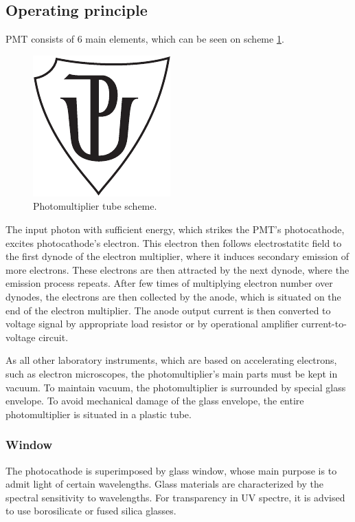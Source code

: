 \subsection{Operating principle}
PMT consists of 6 main elements, which can be seen on scheme \ref{PMT scheme}.

\begin{figure}[H]
 \includegraphics{up_logo_bw}
 \caption{Photomultiplier tube scheme.}
 \label{PMT scheme}
\end{figure}


\par
The input photon with sufficient energy, which strikes the PMT's photocathode, excites photocathode's electron. This electron then follows electrostatitc field to the first dynode of the electron multiplier, where it induces secondary emission of more electrons. These electrons are then attracted by the next dynode, where the emission process repeats. After few times of multiplying electron number over dynodes, the electrons are then collected by 
the anode, which is situated on the end of the electron multiplier. The anode output current is then converted to voltage signal by appropriate load resistor or by operational amplifier current-to-voltage circuit.
\par
As all other laboratory instruments, which are based on accelerating electrons, such as electron microscopes, the photomultiplier's main parts must be kept in vacuum. To maintain vacuum, the photomultiplier is surrounded by special glass envelope. To avoid mechanical damage of the glass envelope, the entire photomultiplier is situated in a plastic tube.

\subsubsection{Window}

The photocathode is superimposed by glass window, whose main purpose is to admit light of certain wavelengths. Glass materials are characterized by the spectral sensitivity to wavelengths. For transparency in UV spectre, it is advised to use borosilicate or fused silica glasses.



